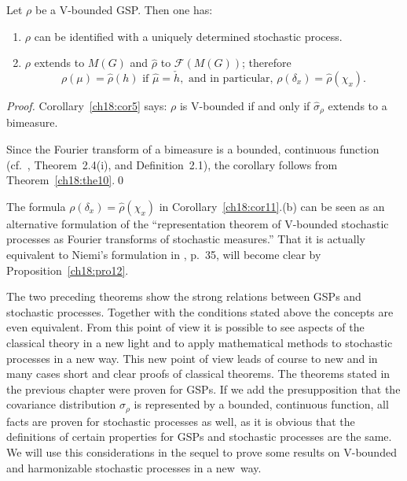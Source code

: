 \documentclass[graybox]{svmult}
\begin{document}
\setcounter{corollary}{10}
\begin{corollary}\label{ch18:cor11}
Let $\rho $ be a V-bounded GSP. Then one has:
\begin{enumerate}
\item[(a)] $\rho $ can be identified
with a uniquely determined stochastic process.

\item[(b)] $\rho $ extends to $M(G)$ and $\hat{\rho}$ to
$\mathcal{F}(M(G))$; therefore
\[
\rho (\mu ) = \hat{\rho}(h)\text{  if }\hat{\mu } = \check{h} ,
\text{ and in particular, }
\rho (\delta _{x}) = \hat{\rho}(\chi _{x}).
\]
\end{enumerate}
\end{corollary}

\begin{proof}
Corollary~\ref{ch18:cor5} says: $\rho$ is V-bounded
if and only if  $\hat{\sigma }_{\rho}$ extends to a bimeasure.

Since the Fourier transform of a bimeasure is a bounded,
continuous function
(cf.\ \cite{grsc84}, Theorem~2.4(i), and Definition~2.1),
the corollary follows from
\hbox{Theorem}~\ref{ch18:the10}.\qed
\end{proof}

\begin{rem}
The formula $\rho (\delta _{x}) =
\hat{\rho}(\chi _{x})$ in Corollary~\ref{ch18:cor11}.(b) can be seen as an alternative
formulation of
the ``representation theorem of V-bounded stochastic  processes  as
Fourier transforms of  stochastic  measures.''  That  it  is  actually
equivalent to Niemi's formulation in \cite{ni75}, p.~35, will become
clear by Proposition~\ref{ch18:pro12}.
\end{rem}

The two preceding theorems show the strong relations between  GSPs
and stochastic processes.  Together  with  the  conditions  stated
above the concepts are even equivalent. From this point of view it
is possible to see aspects of the classical theory in a new  light
and to apply mathematical methods to stochastic processes in a new
way. This new point of view leads of course to  new  and  in  many
cases short and clear proofs of classical theorems.  The  theorems
stated in the previous chapter were proven for GSPs.  If we add the
presupposition that the covariance distribution $\sigma _{\rho}$ is
represented by a bounded, continuous function, all facts are proven for
stochastic processes as well, as it is obvious that the definitions of
certain properties for GSPs and stochastic processes are the same.  We
will use this considerations in the sequel to prove some results on
V-bounded and harmonizable stochastic processes in a new~way.
\end{document}
